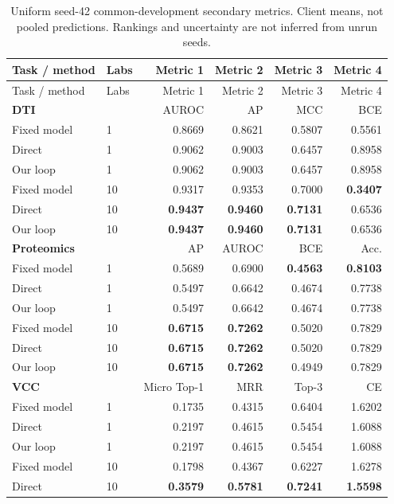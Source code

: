 \begin{longtable}{llrrrr}
\caption{Uniform seed-42 common-development secondary metrics. Client means, not pooled predictions. Rankings and uncertainty are not inferred from unrun seeds.}\label{tab:unified-secondary}\\
\toprule
Task / method & Labs & Metric 1 & Metric 2 & Metric 3 & Metric 4 \\
\midrule\endfirsthead
\toprule Task / method & Labs & Metric 1 & Metric 2 & Metric 3 & Metric 4 \\ \midrule\endhead
\multicolumn{2}{l}{\textbf{DTI}} & AUROC & AP & MCC & BCE \\
Fixed model & 1 & 0.8669 & 0.8621 & 0.5807 & 0.5561 \\
Direct & 1 & 0.9062 & 0.9003 & 0.6457 & 0.8958 \\
Our loop & 1 & 0.9062 & 0.9003 & 0.6457 & 0.8958 \\
Fixed model & 10 & 0.9317 & 0.9353 & 0.7000 & \textbf{0.3407} \\
Direct & 10 & \textbf{0.9437} & \textbf{0.9460} & \textbf{0.7131} & 0.6536 \\
Our loop & 10 & \textbf{0.9437} & \textbf{0.9460} & \textbf{0.7131} & 0.6536 \\
\midrule
\multicolumn{2}{l}{\textbf{Proteomics}} & AP & AUROC & BCE & Acc. \\
Fixed model & 1 & 0.5689 & 0.6900 & \textbf{0.4563} & \textbf{0.8103} \\
Direct & 1 & 0.5497 & 0.6642 & 0.4674 & 0.7738 \\
Our loop & 1 & 0.5497 & 0.6642 & 0.4674 & 0.7738 \\
Fixed model & 10 & \textbf{0.6715} & \textbf{0.7262} & 0.5020 & 0.7829 \\
Direct & 10 & \textbf{0.6715} & \textbf{0.7262} & 0.5020 & 0.7829 \\
Our loop & 10 & \textbf{0.6715} & \textbf{0.7262} & 0.4949 & 0.7829 \\
\midrule
\multicolumn{2}{l}{\textbf{VCC}} & Micro Top-1 & MRR & Top-3 & CE \\
Fixed model & 1 & 0.1735 & 0.4315 & 0.6404 & 1.6202 \\
Direct & 1 & 0.2197 & 0.4615 & 0.5454 & 1.6088 \\
Our loop & 1 & 0.2197 & 0.4615 & 0.5454 & 1.6088 \\
Fixed model & 10 & 0.1798 & 0.4367 & 0.6227 & 1.6278 \\
Direct & 10 & \textbf{0.3579} & \textbf{0.5781} & \textbf{0.7241} & \textbf{1.5598} \\

\end{longtable}
